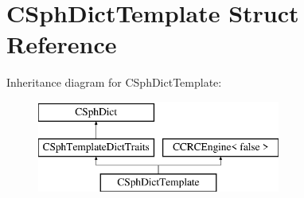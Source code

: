 \hypertarget{structCSphDictTemplate}{\section{C\-Sph\-Dict\-Template Struct Reference}
\label{structCSphDictTemplate}
}
Inheritance diagram for C\-Sph\-Dict\-Template\-:\begin{figure}[H]
\begin{center}
\leavevmode
\includegraphics[height=3.000000cm]{structCSphDictTemplate}
\end{center}
\end{figure}
